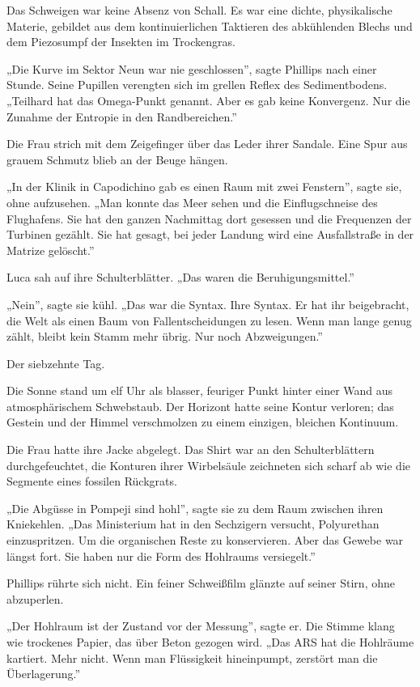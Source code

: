 \documentclass[
  ngerman,
]{article}
\begin{document}
Das Schweigen war keine Absenz von Schall. Es war eine dichte,
physikalische Materie, gebildet aus dem kontinuierlichen Taktieren des
abkühlenden Blechs und dem Piezosumpf der Insekten im Trockengras.

„Die Kurve im Sektor Neun war nie geschlossen'', sagte Phillips nach
einer Stunde. Seine Pupillen verengten sich im grellen Reflex des
Sedimentbodens. „Teilhard hat das Omega-Punkt genannt. Aber es gab keine
Konvergenz. Nur die Zunahme der Entropie in den Randbereichen.''

Die Frau strich mit dem Zeigefinger über das Leder ihrer Sandale. Eine
Spur aus grauem Schmutz blieb an der Beuge hängen.

„In der Klinik in Capodichino gab es einen Raum mit zwei Fenstern'',
sagte sie, ohne aufzusehen. „Man konnte das Meer sehen und die
Einflugschneise des Flughafens. Sie hat den ganzen Nachmittag dort
gesessen und die Frequenzen der Turbinen gezählt. Sie hat gesagt, bei
jeder Landung wird eine Ausfallstraße in der Matrize gelöscht.''

Luca sah auf ihre Schulterblätter. „Das waren die Beruhigungsmittel.''

„Nein'', sagte sie kühl. „Das war die Syntax. Ihre Syntax. Er hat ihr
beigebracht, die Welt als einen Baum von Fallentscheidungen zu lesen.
Wenn man lange genug zählt, bleibt kein Stamm mehr übrig. Nur noch
Abzweigungen.''

Der siebzehnte Tag.

Die Sonne stand um elf Uhr als blasser, feuriger Punkt hinter einer Wand
aus atmosphärischem Schwebstaub. Der Horizont hatte seine Kontur
verloren; das Gestein und der Himmel verschmolzen zu einem einzigen,
bleichen Kontinuum.

Die Frau hatte ihre Jacke abgelegt. Das Shirt war an den
Schulterblättern durchgefeuchtet, die Konturen ihrer Wirbelsäule
zeichneten sich scharf ab wie die Segmente eines fossilen Rückgrats.

„Die Abgüsse in Pompeji sind hohl'', sagte sie zu dem Raum zwischen
ihren Kniekehlen. „Das Ministerium hat in den Sechzigern versucht,
Polyurethan einzuspritzen. Um die organischen Reste zu konservieren.
Aber das Gewebe war längst fort. Sie haben nur die Form des Hohlraums
versiegelt.''

Phillips rührte sich nicht. Ein feiner Schweißfilm glänzte auf seiner
Stirn, ohne abzuperlen.

„Der Hohlraum ist der Zustand vor der Messung'', sagte er. Die Stimme
klang wie trockenes Papier, das über Beton gezogen wird. „Das ARS hat
die Hohlräume kartiert. Mehr nicht. Wenn man Flüssigkeit hineinpumpt,
zerstört man die Überlagerung.''
\end{document}
